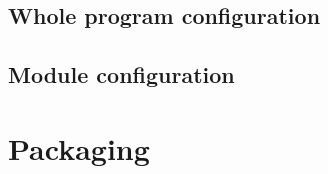 \documentclass[draftmode,draftwater]{memarticle}
\begin{document}



\subsection{Whole program configuration}


\subsection{Module configuration}


\section{Packaging}


\end{document}
